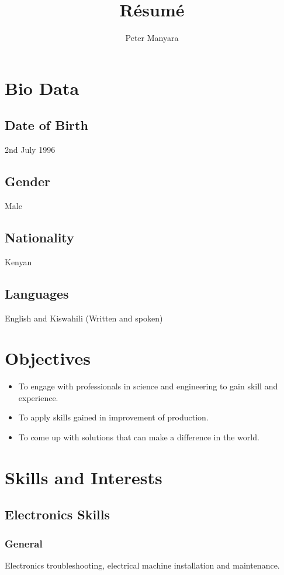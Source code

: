 \documentclass[a4paper]{article}
\title{R\'esum\'e}
\author{Peter Manyara}
\begin{document}
\maketitle

\section{Bio Data}

\subsection{Date of Birth}
2nd July 1996
\subsection{Gender}
Male
\subsection{Nationality}
Kenyan
\subsection{Languages}
English and Kiswahili (Written and spoken)

\section{Objectives}
\begin{itemize}
	\item To engage with professionals in science and engineering to gain skill and experience.
	\item To apply skills gained in improvement of production.
	\item To come up with solutions that can make a difference in the world. 
\end{itemize}

\section{Skills and Interests}
\subsection{Electronics Skills}
\subsubsection{General}
Electronics troubleshooting, electrical machine installation and maintenance.
\end{document}
